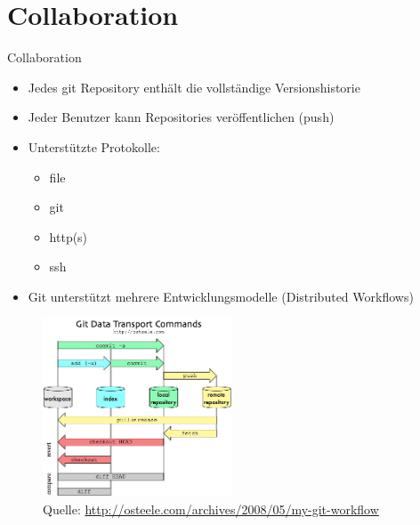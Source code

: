 \section{Collaboration}

\begin{frame}
  \tableofcontents[currentsection]
\end{frame}

\begin{frame}{Collaboration}
  \begin{itemize}
    \item Jedes git Repository enthält die vollständige Versionshistorie
    \item Jeder Benutzer kann Repositories veröffentlichen (push)
    \item Unterstützte Protokolle:
    \begin{itemize}
      \item file
      \item git
      \item http(s)
      \item ssh
    \end{itemize}
    \item Git unterstützt mehrere Entwicklungsmodelle (Distributed Workflows)
  \end{itemize}
\end{frame}

\begin{frame}
  \begin{figure}
    \includegraphics[width=0.5\textwidth]{img/git-transport}
    \caption[format=empty]{Quelle: \url{http://osteele.com/archives/2008/05/my-git-workflow}}
  \end{figure}
  
\end{frame}


